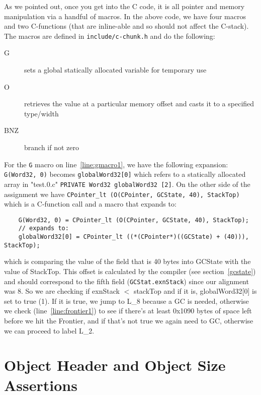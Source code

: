 As we pointed out, once you get into the C code, it is all pointer and memory manipulation via a handful of macros. In the above code, we have four macros and two C-functions (that are inline-able and so should not affect the C-stack). The macros are defined in \texttt{include/c-chunk.h} and do the following:

\begin{description}
\item[G] sets a global statically allocated variable for temporary use
\item[O] retrieves the value at a particular memory offset and casts it to a specified type/width
\item[BNZ] branch if not zero
\end{description}

For the \texttt{G} macro on line~\ref{line:gmacro1}, we have the following expansion:
\texttt{G(Word32, 0)} becomes \texttt{globalWord32[0]} which refers to a statically allocated array in "test.0.c" \texttt{PRIVATE Word32 globalWord32 [2]}. On the other side of the assignment we have \texttt{CPointer\_lt (O(CPointer, GCState, 40), StackTop)} which is a C-function call and a macro that expands to:

\begin{minipage}{\linewidth}
\lstset{language=C,numbers=none,frame=none}\begin{lstlisting}
    G(Word32, 0) = CPointer_lt (O(CPointer, GCState, 40), StackTop);
    // expands to:
    globalWord32[0] = CPointer_lt ((*(CPointer*)((GCState) + (40))), StackTop);
\end{lstlisting}
\end{minipage}

which is comparing the value of the field that is 40 bytes into GCState with the value of StackTop. This offset is calculated by the compiler (see section~\ref{gcstate}) and should correspond to the fifth field (\texttt{GCStat.exnStack}) since our alignment was 8. So we are checking if exnStack $<$ stackTop and if it is, globalWord32[0] is set to true (1). If it is true, we jump to L\_8 because a GC is needed, otherwise we check (line~\ref{line:frontier1}) to see if there's at least 0x1090 bytes of space left before we hit the Frontier, and if that's not true we again need to GC, otherwise we can proceed to label L\_2.

\section{Object Header and Object Size Assertions}

